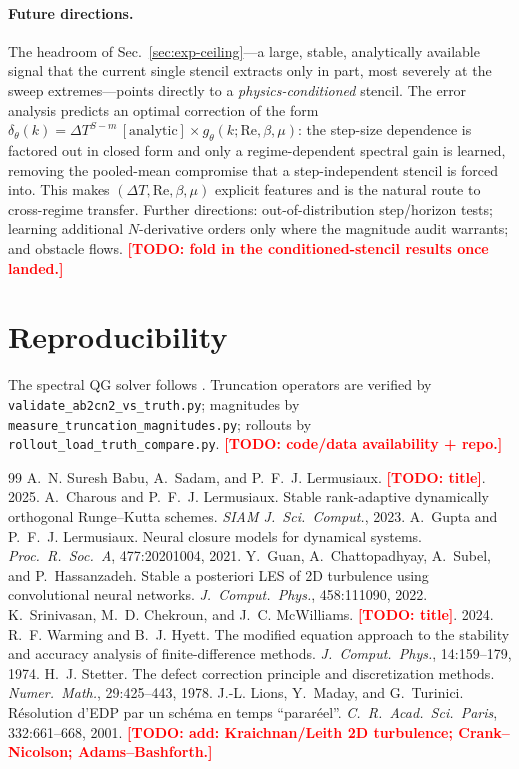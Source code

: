 \documentclass[11pt]{article}
\theoremstyle{plain}
\theoremstyle{definition}
\newcommand{\TODO}[1]{\textcolor{red}{\textbf{[TODO: #1]}}}
\newcommand{\DT}{\Delta T}
\begin{document}
\paragraph{Future directions.}
The headroom of Sec.~\ref{sec:exp-ceiling}---a large, stable, analytically
available signal that the current single stencil extracts only in part, most
severely at the sweep extremes---points directly to a \emph{physics-conditioned}
stencil. The error analysis predicts an optimal correction of the form
$\delta_\theta(k)=\DT^{S-m}\,[\text{analytic}]\times g_\theta(k;\mathrm{Re},
\beta,\mu)$: the step-size dependence is factored out in closed form and only a
regime-dependent spectral gain is learned, removing the pooled-mean compromise
that a step-independent stencil is forced into. This makes $(\DT,\mathrm{Re},
\beta,\mu)$ explicit features and is the natural route to cross-regime transfer.
Further directions: out-of-distribution step/horizon tests; learning additional
$N$-derivative orders only where the magnitude audit warrants; and obstacle
flows. \TODO{fold in the conditioned-stencil results once landed.}

\section*{Reproducibility}
The spectral QG solver follows \citet{sureshbabu2025}. Truncation operators are
verified by \texttt{validate\_ab2cn2\_vs\_truth.py}; magnitudes by
\texttt{measure\_truncation\_magnitudes.py}; rollouts by
\texttt{rollout\_load\_truth\_compare.py}. \TODO{code/data availability + repo.}


\begin{thebibliography}{99}
A.~N. Suresh Babu, A.~Sadam, and P.~F.~J. Lermusiaux. \TODO{title}. 2025.
A.~Charous and P.~F.~J. Lermusiaux. Stable rank-adaptive dynamically orthogonal
Runge--Kutta schemes. \emph{SIAM J.\ Sci.\ Comput.}, 2023.
A.~Gupta and P.~F.~J. Lermusiaux. Neural closure models for dynamical systems.
\emph{Proc.\ R.\ Soc.\ A}, 477:20201004, 2021.
Y.~Guan, A.~Chattopadhyay, A.~Subel, and P.~Hassanzadeh. Stable a posteriori
LES of 2D turbulence using convolutional neural networks. \emph{J.\ Comput.\
Phys.}, 458:111090, 2022.
K.~Srinivasan, M.~D. Chekroun, and J.~C. McWilliams. \TODO{title}. 2024.
\bibitem[Warming \& Hyett(1974)]{warming1974}
R.~F. Warming and B.~J. Hyett. The modified equation approach to the stability
and accuracy analysis of finite-difference methods. \emph{J.\ Comput.\ Phys.},
14:159--179, 1974.
H.~J. Stetter. The defect correction principle and discretization methods.
\emph{Numer.\ Math.}, 29:425--443, 1978.
J.-L. Lions, Y.~Maday, and G.~Turinici. R\'esolution d'EDP par un sch\'ema en
temps ``parar\'eel''. \emph{C.\ R.\ Acad.\ Sci.\ Paris}, 332:661--668, 2001.
\TODO{add: Kraichnan/Leith 2D turbulence; Crank--Nicolson; Adams--Bashforth.}
\end{thebibliography}
\end{document}
